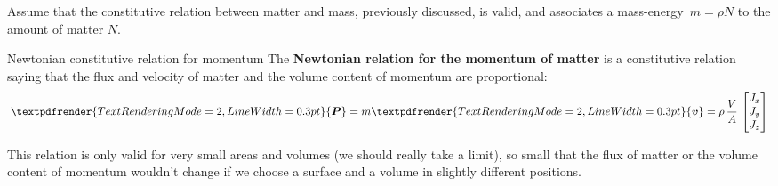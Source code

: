 \documentclass[a4paper,12pt,%
onecolumn,oneside,titlepage,%
british%
]{memoir}
\renewcommand*{\bm}[1]{\textpdfrender{TextRenderingMode=2,LineWidth=0.3pt}{\boldsymbol{#1}}}
\renewcommand*{\|}[1][]{\nonscript\:#1\vert\nonscript\:\mathopen{}}
\newcommand*{\masse}{mass-energy}
\newcommand*{\yv}{\bm{v}}
\newcommand*{\yN}{N}
\newcommand*{\yrho}{\rho}
\newcommand*{\yM}{m}%
\newcommand*{\yP}{\bm{P}}
\begin{document}
Assume that the constitutive relation between matter and mass, previously discussed, is valid, and associates a \masse\ $\yM=\yrho\yN$ to the amount of matter $\yN$.

%
\begin{definition}{Newtonian constitutive relation for momentum}
The \textbf{Newtonian relation for the momentum of matter} is a constitutive relation saying that the flux and velocity of matter and the volume content of momentum are proportional:
  \begin{equation}
    \label{neq:matter_momentum_Newton}
    \yP = \yM\yv = \yrho\, \frac{V}{A}\,
  \begin{bmatrix}
    J_{x}\\J_{y}\\J_{z}
  \end{bmatrix}
  \end{equation}
\end{definition}
This relation is only valid for very small areas and volumes (we should really take a limit), so small that the flux of matter or the volume content of momentum wouldn't change if we choose a surface and a volume in slightly different positions.
\end{document}
